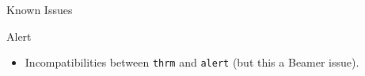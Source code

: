 	\begin{frame}[fragile]{Known Issues}
		\begin{alertblock}{Alert}
			\begin{itemize}
			 	\item Incompatibilities between \verb|thrm| and \verb|alert| (but this a Beamer issue).
			\end{itemize}
	   \end{alertblock}
	\end{frame}
